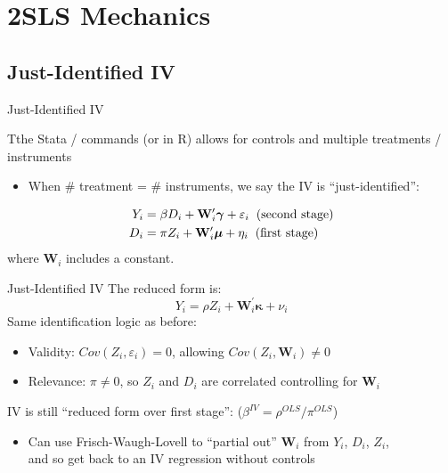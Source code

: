 \documentclass{beamer}
\begin{document}
\section{2SLS Mechanics}

\subsection{Just-Identified IV}
\begin{frame}{Just-Identified IV}

Tthe Stata / commands (or  in R) allows for controls and multiple treatments / instruments
\begin{itemize}
  \item When \# treatment = \# instruments, we say the IV is ``just-identified'':
\end{itemize}\pause\vspace{-0.7cm}

\begin{align*}
Y_i &=  \beta D_i +\mathbf{W}_i^\prime\boldsymbol{\gamma} +  \varepsilon_i\hspace{0.2cm}\text{(second stage)}\\
D_i &= \pi Z_i + \mathbf{W}_i^\prime\boldsymbol{\mu} + \eta_i\hspace{0.2cm}\text{(first stage)}
\end{align*}
where $\mathbf{W}_i$ includes a constant.
\end{frame}

\begin{frame}{Just-Identified IV}
The reduced form is: $$Y_i= \rho Z_i + \mathbf{W}_i^\prime\boldsymbol{\kappa}+\nu_i $$\pause
Same identification logic as before:

\begin{itemize}
  \item Validity: $Cov(Z_i,\varepsilon_i)=0$, allowing $Cov(Z_i,\mathbf{W}_i)\neq 0$\pause
  \item Relevance: $\pi\neq 0$, so $Z_i$ and $D_i$ are correlated controlling for $\mathbf{W}_i$
\end{itemize}\pause\medskip

IV is still ``reduced form over first stage'': ($\beta^{IV}=\rho^{OLS}/\pi^{OLS}$)\pause\vspace{0.1cm}
\begin{itemize}
  \item Can use Frisch-Waugh-Lovell to ``partial out'' $\mathbf{W}_i$ from $Y_i$, $D_i$, $Z_i$, \\ and so get back to an IV regression without controls
\end{itemize}
\end{frame}
\end{document}
